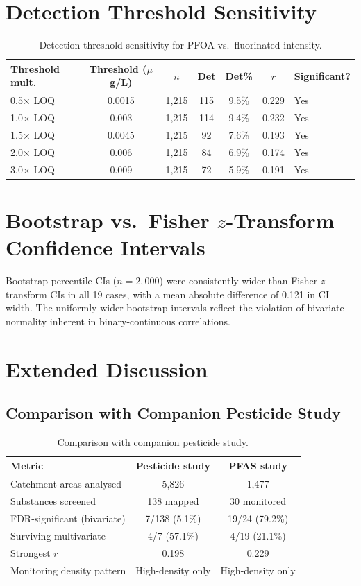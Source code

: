 \documentclass[12pt,a4paper]{article}
\begin{document}
\section{Detection Threshold Sensitivity}

\begin{table}[H]
\centering
\caption{Detection threshold sensitivity for PFOA vs.\ fluorinated intensity.}
\footnotesize
\begin{tabular}{@{}lcccccl@{}}
\toprule
Threshold mult. & Threshold ($\mu$g/L) & $n$ & Det & Det\% & $r$ & Significant? \\
\midrule
0.5$\times$ LOQ & 0.0015 & 1,215 & 115 & 9.5\% & 0.229 & Yes \\
1.0$\times$ LOQ & 0.003 & 1,215 & 114 & 9.4\% & 0.232 & Yes \\
1.5$\times$ LOQ & 0.0045 & 1,215 & 92 & 7.6\% & 0.193 & Yes \\
2.0$\times$ LOQ & 0.006 & 1,215 & 84 & 6.9\% & 0.174 & Yes \\
3.0$\times$ LOQ & 0.009 & 1,215 & 72 & 5.9\% & 0.191 & Yes \\
\bottomrule
\end{tabular}
\end{table}

\section{Bootstrap vs.\ Fisher $z$-Transform Confidence Intervals}

Bootstrap percentile CIs ($n = 2{,}000$) were consistently wider than Fisher $z$-transform CIs in all 19 cases, with a mean absolute difference of 0.121 in CI width. The uniformly wider bootstrap intervals reflect the violation of bivariate normality inherent in binary-continuous correlations.

\section{Extended Discussion}

\subsection{Comparison with Companion Pesticide Study}

\begin{table}[H]
\centering
\caption{Comparison with companion pesticide study.}
\begin{tabular}{@{}lcc@{}}
\toprule
Metric & Pesticide study & PFAS study \\
\midrule
Catchment areas analysed & 5,826 & 1,477 \\
Substances screened & 138 mapped & 30 monitored \\
FDR-significant (bivariate) & 7/138 (5.1\%) & 19/24 (79.2\%) \\
Surviving multivariate & 4/7 (57.1\%) & 4/19 (21.1\%) \\
Strongest $r$ & 0.198 & 0.229 \\
Monitoring density pattern & High-density only & High-density only \\
\bottomrule
\end{tabular}
\end{table}
\end{document}
